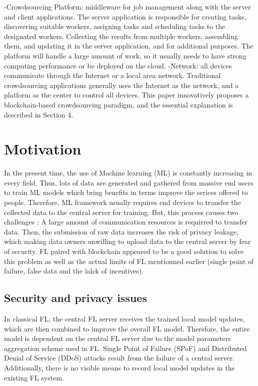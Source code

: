 \documentclass{article}
\begin{document}
\newline \newline -Crowdsourcing Platform: middleware for job management along with the server and client applications. The server application is responsible for creating tasks, discovering suitable workers, assigning tasks and scheduling tasks to the designated workers. Collecting the results from multiple workers, assembling them, and updating it in the server application, and for additional purposes. The platform will handle a large amount of work, so it usually needs to have strong computing performance or be deployed on the cloud.
\newline \newline -Network: all devices communicate through the Internet or a local area network. Traditional crowdsourcing applications generally uses the Internet as the network, and a platform as the center to control all devices. This paper innovatively proposes a blockchain-based crowdsourcing paradigm, and the essential explanation is described in Section 4.


\section{Motivation}

In the present time, the use of Machine learning (ML) is constantly increasing in every field. Thus, lots of data are generated and gathered from massive end users to train ML models which bring benefits in terms improve the serices offered to people. Therefore, ML framework usually requires end devices to transfer the collected data to the central server for training. But, this process causes two challenges : A large amount of communication resources is requirred to transfer data. Then, the submission of raw data increases the risk of privacy leakage, which making data owners unwilling to upload data to the central server by fear of security. FL paired with blockchain appeared to be a good solution to solve this problem as well as the actual limits of FL mentionned earlier (single point of failure, false data and the lalck of incentives).

\subsection{Security and privacy issues}

In classical FL, the central FL server receives the trained local model updates, which are then combined to improve the overall FL model. Therefore, the entire model is dependent on the central FL server due to the model parameters aggregation scheme used in FL. Single Point of Failure (SPoF) and Distributed Denial of Service (DDoS) attacks result from the failure of a central server. Additionally, there is no visible means to record local model updates in the existing FL system.
\end{document}
